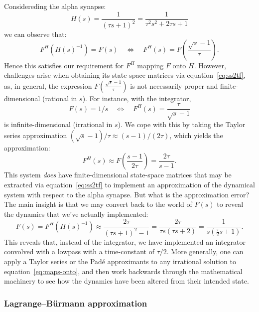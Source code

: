 Considereding the alpha synapse:
$$H(s) = \frac{1}{(\tau s + 1)^2} = \frac{1}{\tau^2 s^2 + 2\tau s + 1}$$
we can observe that:
$$F^H \left( H(s)^{-1} \right) = F(s) \quad \iff \quad F^H(s) = F \left( \frac{\sqrt{s} - 1}{\tau} \right) \text{.}$$
Hence this satisfies our requirement for $F^H$ mapping $F$ onto $H$.
However, challenges arise when obtaining its state-space matrices via equation~\ref{eq:ss2tf}, as,
in general, the expression $F \left( \frac{\sqrt{s} - 1}{\tau} \right)$ is not necessarily proper and finite-dimensional (rational in $s$). For instance, with the integrator,
$$F(s) = 1/s \quad \iff \quad F^H(s) = \frac{\tau}{\sqrt{s} - 1}$$
is infinite-dimensional (irrational in $s$).
We cope with this by taking the Taylor series approximation $(\sqrt{s} - 1) / \tau \approx \left( s - 1 \right) / (2 \tau)$, which yields the approximation:
\begin{equation} \label{eq:taylor-integral}
F^H(s) \approx F \left( \frac{s-1}{2\tau} \right) = \frac{2 \tau}{s - 1} \text{.}
\end{equation}
This system \emph{does} have finite-dimensional state-space matrices that may be extracted via equation~\ref{eq:ss2tf} to implement an approximation of the dynamical system with respect to the alpha synapse.
But what is the approximation error?
The main insight is that we may convert back to the world of $F(s)$ to reveal the dynamics that we've actually implemented:
$$F(s) = F^H \left( H(s)^{-1} \right) \approx \frac{2\tau}{(\tau s + 1)^2 - 1} = \frac{2\tau}{\tau s (\tau s + 2)} = \frac{1}{s \left( \frac{\tau}{2} s + 1 \right) } \text{.}$$
This reveals that, instead of the integrator, we have implemented an integrator convolved with a lowpass with a time-constant of $\tau / 2$.
More generally, one can apply a Taylor series or the Pad\'e approximants to any irrational solution to equation~\ref{eq:maps-onto}, and then work backwards through the mathematical machinery to see how the dynamics have been altered from their intended state. 

\subsubsection{Lagrange--B\"urmann approximation}

